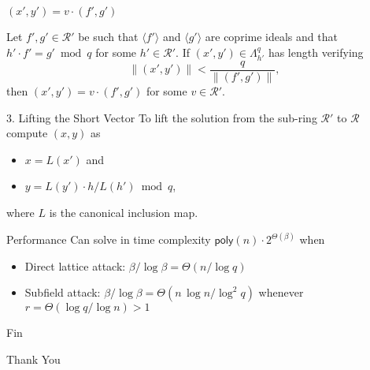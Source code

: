 \documentclass[presentation,smaller]{beamer}
\newcommand{\cR}{\ensuremath{\mathcal{R}}\xspace}
\begin{document}
\begin{frame}[label={sec:org372573e}]{\((x',y') = v ⋅ (f',g')\)}
\begin{theorem}
Let \(f',g' \in \cR'\) be such that \(⟨ f'⟩\) and \(⟨ g'⟩\) are coprime ideals and that \(h'⋅ f' = g' \bmod q\) for some \(h' \in \cR'\). If \((x',y') \in Λ_{h'}^q\) has length verifying
\[\|(x',y') \| < \frac q {\|(f',g')\|},\]
then \((x',y') = v ⋅ (f',g')\) for some \(v ∈ \cR'\).
\end{theorem}
\end{frame}

\begin{frame}[label={sec:orgec191e6}]{3. Lifting the Short Vector}
To lift the solution from the sub-ring \(\cR'\) to \(\cR\) compute \((x,y)\) as
\begin{itemize}
\item \(x = L(x')\)  and
\item \(y = L(y') ⋅ h / L(h') \bmod q\),
\end{itemize}
where \(L\) is the canonical inclusion map.
\end{frame}

\begin{frame}[label={sec:org9d13319}]{Performance}
Can solve in time complexity \(\mathsf{poly}(n ) \cdot 2^{\Theta(\beta)}\) when

\begin{itemize}[<+->]
\item \alert{Direct lattice attack}: \(\beta / \log \beta = \Theta\left( n / \log q \right)\)
\item \alert{Subfield attack}: \(\beta / \log \beta = \Theta\left( n\, \log n / \log^2 q \right)\) whenever \(r = \Theta(\log q / \log n) > 1\)
\end{itemize}
\end{frame}


\begin{frame}[label={sec:org5ae2a28}]{Fin}
\begin{center}
\Huge \alert{Thank You}
\end{center}

\end{frame}
\end{document}
